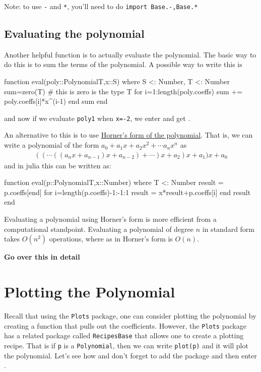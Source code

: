 Note: to use \texttt{-} and \texttt{*}, you'll need to do \verb|import Base.-,Base.*|


\hypertarget{evaluating-the-polynomial}{%
\subsection{Evaluating the
polynomial}\label{evaluating-the-polynomial}}

Another helpful function is to actually evaluate the polynomial. The
basic way to do this is to sum the terms of the polynomial.  A possible way to write this is 
%
\begin{jlblock}[poly]
function eval(poly::Polynomial{T},x::S) where {S <: Number, T <: Number}
  sum=zero(T)  # this is zero is the type T
  for i=1:length(poly.coeffs)
    sum += poly.coeffs[i]*x^(i-1)
  end
  sum
end
\end{jlblock}
and now if we evaluate \texttt{poly1} when \verb!x=-2!, we enter  and get  \printpythontex[verb]. 

An alternative to this is to use \href{https://en.wikipedia.org/wiki/Horner\%27s_method}{Horner's form of the polynomial}.  That is, we can write a polynomial of the form $a_0 + a_1 x+ a_2 x^2 + \cdots a_n x^n$ as 
\begin{align*}
((\cdots((a_n x + a_{n-1})x+a_{n-2}) + \cdots)x +a_2)x + a_1)x + a_0
\end{align*}
%
and in julia this can be written as:
\begin{jlverbatim}[poly]
function eval(p::Polynomial{T},x::Number) where {T <: Number}
  result = p.coeffs[end] 
  for i=length(p.coeffs)-1:-1:1
    result = x*result+p.coeffs[i]
  end
  result
end
\end{jlverbatim}

Evaluating a polynomial using Horner's form is more efficient from a computational standpoint. Evaluating a polynomial of degree $n$ in standard form takes $O(n^2)$ operations, where as in Horner's form is $O(n)$.

{\color{red} \textbf{Go over this in detail}}

\section{Plotting the Polynomial}

Recall that using the \texttt{Plots} package, one can consider plotting the polynomial by creating a function that pulls out the coefficients.  However, the \texttt{Plots} package has a related package called \texttt{RecipesBase} that allows one to create a plotting recipe.  That is if \texttt{p} is a \texttt{Polynomial}, then we can write \texttt{plot(p)} and it will plot the polynomial.  Let's see how and don't forget to add the package and then enter .

